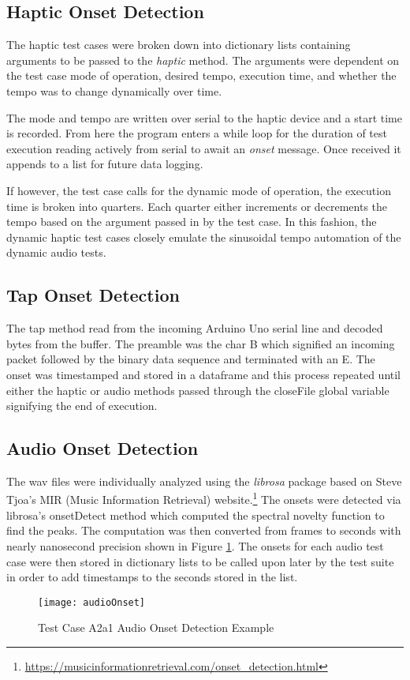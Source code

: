 \subsection{Haptic Onset Detection}
The haptic test cases were broken down into dictionary lists containing arguments to be passed to the \textit{haptic} method. The arguments were dependent on the test case mode of operation, desired tempo, execution time, and whether the tempo was to change dynamically over time.

The mode and tempo are written over serial to the haptic device and a start time is recorded. From here the program enters a while loop for the duration of test execution reading actively from serial to await an \textit{onset} message. Once received it appends to a list for future data logging.

If however, the test case calls for the dynamic mode of operation, the execution time is broken into quarters. Each quarter either increments or decrements the tempo based on the argument passed in by the test case. In this fashion, the dynamic haptic test cases closely emulate the sinusoidal tempo automation of the dynamic audio tests.
\subsection{Tap Onset Detection}
The tap method read from the incoming Arduino Uno serial line and decoded bytes from the buffer. The preamble was the char B which signified an incoming packet followed by the binary data sequence and terminated with an E. The onset was timestamped and stored in a dataframe and this process repeated until either the haptic or audio methods passed through the closeFile global variable signifying the end of execution.
\subsection{Audio Onset Detection}
The wav files were individually analyzed using the \textit{librosa} package based on Steve Tjoa's MIR (Music Information Retrieval) website.\footnote{\url{https://musicinformationretrieval.com/onset_detection.html}}
The onsets were detected via librosa's onsetDetect method which computed the spectral novelty function to find the peaks. The computation was then converted from frames to seconds with nearly nanosecond precision shown in Figure \ref{fig:AudioOnset}. The onsets for each audio test case were then stored in dictionary lists to be called upon later by the test suite in order to add timestamps to the seconds stored in the list.
\begin{figure}[H]
    \centering
    \texttt{[image: audioOnset]}
    \caption{Test Case A2a1 Audio Onset Detection Example}
    \label{fig:AudioOnset}
\end{figure}

